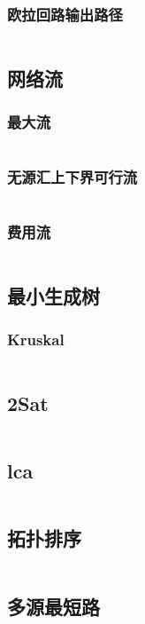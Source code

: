 \documentclass[a4paper,11pt]{article}
\begin{document}
\subsubsection{欧拉回路输出路径} %
\inputminted[breaklines]{c++}{图论/欧拉回路输出路径.cpp}
\subsection{网络流} %
\subsubsection{最大流} %
\inputminted[breaklines]{c++}{图论/最大流.cpp} %
\subsubsection{无源汇上下界可行流} %
\inputminted[breaklines]{c++}{图论/无源汇上下界最大流.cpp} %
\subsubsection{费用流} %
\inputminted[breaklines]{c++}{图论/费用流.cpp} %
\subsection{最小生成树} %
\subsubsection{Kruskal} %
\inputminted[breaklines]{c++}{图论/Kruskal.cpp} %
\subsection{2Sat} %
\inputminted[breaklines]{c++}{图论/2sat.cpp} %
\subsection{lca} %
\inputminted[breaklines]{c++}{图论/lca.cpp} %
\subsection{拓扑排序}
\inputminted[breaklines]{c++}{图论/拓扑排序.cpp}
\subsection{多源最短路}
\end{document}
